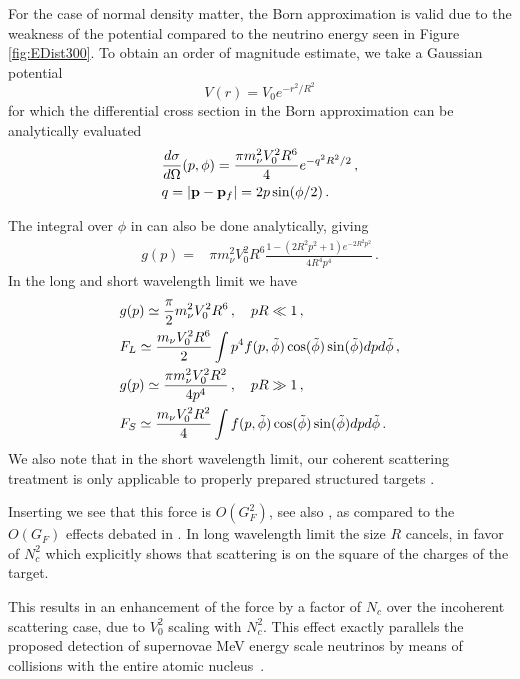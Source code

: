 For the case of normal density matter, the Born approximation is valid due to the weakness of the potential compared to the neutrino energy seen in Figure \ref{fig:EDist300}. To obtain an order of magnitude estimate, we take a Gaussian potential \begin{equation}
V(r)=V_0e^{-r^2/R^2}
\end{equation}
for which the differential cross section in the Born approximation can be analytically evaluated
\begin{align}
&\frac{d\sigma}{ d\Omega}(p,\phi)=\frac{\pi m_\nu^2V_0^2R^6}{4}e^{-q^2R^2/2}\,,\notag\\
&q=|{\bf p}-{\bf p}_f|=2p\sin(\phi/2)\,.
\end{align}

The integral over $\phi$ in  can also be done analytically, giving
\begin{align}
g(p)=&\pi m_\nu^2V_0^2R^6\frac{1-(2R^2p^2+1)e^{-2R^2p^2}}{4R^4p^4}\,.
\end{align}
 In the long and short wavelength limit we have 
\begin{align}
\label{longWaveDrag}
&g(p)\simeq\frac{\pi}{2} m_\nu^2V_0^2R^6\,,\quad pR\ll 1\,,\\
&F_L\simeq \frac{m_\nu V_0^2R^6}{2} \int p^4 f(p,\tilde\phi) \cos(\tilde\phi) \sin(\tilde\phi) dpd\tilde\phi\,,\notag\\
\label{shortWaveDrag}
&g(p)\simeq\frac{\pi m_\nu^2V_0^2R^2}{4p^4}\,, 
\quad pR\gg 1\,,\\
&F_S\simeq \frac{ m_\nu V_0^2R^2}{4} \int f(p,\tilde\phi) \cos(\tilde\phi) \sin(\tilde\phi) dpd\tilde\phi\notag\,.
\end{align}
 We also note that in the short wavelength limit, our coherent scattering treatment is only applicable to properly prepared structured targets \cite{Liao:2012wb}.

Inserting  we see that this force is $O(G_F^2)$, see also \cite{Shvartsman,Smith:1983jj,Gelmini:2004hg}, as compared to the $O(G_F)$ effects debated in  \cite{Opher:1974drq,Lewis:1979mu,Opher2,Cabibbo:1982bb,Langacker:1982ih,Smith:1983jj,Ferreras:1995wf}. In long wavelength limit the size $R$ cancels, in favor of $N_c^2$ which explicitly shows that scattering is on the square of the charges of the target. 

This results in an enhancement of the force by a factor of $N_c$ over the incoherent scattering case, due to $V_0^2$ scaling with $N_c^2$. This effect exactly parallels the proposed detection of supernovae MeV energy scale neutrinos by means of collisions with the entire atomic nucleus~\cite{Divari:2012zz}.  

